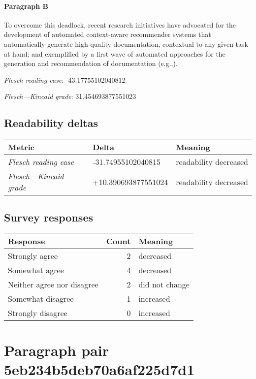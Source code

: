 \paragraph{Paragraph B}
To overcome this deadlock, recent research initiatives have advocated for the development of automated context-aware recommender systems that automatically generate high-quality documentation, contextual to any given task at hand; and exemplified by a first wave of automated approaches for the generation and recommendation of documentation (e.g.,).\par\medskip\emph{Flesch reading ease}: -43.17755102040812\par\emph{Flesch---Kincaid grade}: 31.454693877551023

\subsection{Readability deltas}

\begin{tabular}{lll}
\toprule
               \textbf{Metric} &       \textbf{Delta} &       \textbf{Meaning} \\
\midrule
    \emph{Flesch reading ease} &   -31.74955102040815 &  readability decreased \\
 \emph{Flesch---Kincaid grade} &  +10.390693877551024 &  readability decreased \\
\bottomrule
\end{tabular}

\subsection{Survey responses}
\begin{tabular}{lrl}
\toprule
          \textbf{Response} &  \textbf{Count} & \textbf{Meaning} \\
\midrule
             Strongly agree &               2 &        decreased \\
             Somewhat agree &               4 &        decreased \\
 Neither agree nor disagree &               2 &   did not change \\
          Somewhat disagree &               1 &        increased \\
          Strongly disagree &               0 &        increased \\
\bottomrule
\end{tabular}

\section{Paragraph pair 5eb234b5deb70a6af225d7d1}
